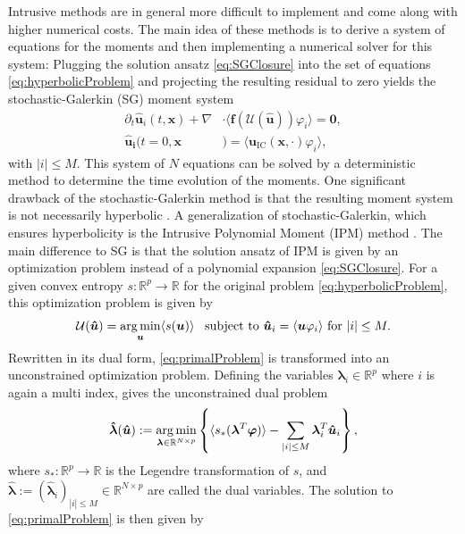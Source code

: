 Intrusive methods are in general more difficult to implement and come along with higher numerical costs. The main idea of these methods is to derive a system of equations for the moments and then implementing a numerical solver for this system: Plugging the solution ansatz \eqref{eq:SGClosure} into the set of equations \eqref{eq:hyperbolicProblem} and projecting the resulting residual to zero yields the stochastic-Galerkin (SG) \cite{ghanem2003stochastic} moment system
\begin{subequations}\label{eq:SGMomentSystem}
\begin{align}
\partial_t \bm{\hat u}_i(t,\bm{x}) + \nabla&\cdot\langle\bm{f}(\mathcal{U}(\bm{\hat u})) \varphi_i\rangle = \bm{0}, \\
\bm{\hat u_i}(t=0,\bm{x}&) = \langle\bm{u}_{\text{IC}}(\bm{x},\cdot)\varphi_i\rangle,
\end{align}
\end{subequations}
with $|i|\leq M$. This system of $N$ equations can be solved by a deterministic method to determine the time evolution of the moments. One significant drawback of the stochastic-Galerkin method is that the resulting moment system is not necessarily hyperbolic \cite{poette2009uncertainty}. A generalization of stochastic-Galerkin, which ensures hyperbolicity is the Intrusive Polynomial Moment (IPM) method \cite{poette2009uncertainty}. The main difference to SG is that the solution ansatz of IPM is given by an optimization problem instead of a polynomial expansion \eqref{eq:SGClosure}. For a given convex entropy $s:\mathbb{R}^p\to\mathbb{R}$ for the original problem \eqref{eq:hyperbolicProblem}, this optimization problem is given by
\begin{align}\label{eq:primalProblem}
\mathcal{U}(\bm{\hat u}) = \operatorname*{arg\,min}_{\bm u} \langle s(\bm u) \rangle \enskip \text{ subject to } \bm{\hat u}_i = \langle \bm u \varphi_i \rangle \text{ for } |i| \leq M.
\end{align}
Rewritten in its dual form, \eqref{eq:primalProblem} is transformed into an unconstrained optimization problem. Defining the variables $\bm{\lambda}_i\in\mathbb{R}^p$ where $i$ is again a multi index, gives the unconstrained dual problem
\begin{align}\label{eq:dualProblem}
 \bm{\hat \lambda}(\bm{\hat u}) := \operatorname*{arg\,min}_{\bm{\lambda} \in \mathbb{R}^{N \times p}}
  \left\{\langle s_*(\bm{\lambda}^T \bm\varphi)\rangle - \sum_{|i|\leq M}\bm{\lambda}_i^T \bm{\hat u}_i\right\},
\end{align}
where $s_*:\mathbb{R}^p\to\mathbb{R}$ is the Legendre transformation of $s$, and $\bm{ \hat\lambda}:=(\bm{\hat{\lambda}}_i)_{|i|\leq M}\in \mathbb{R}^{N \times p}$ are called the dual variables. The solution to \eqref{eq:primalProblem} is then given by
